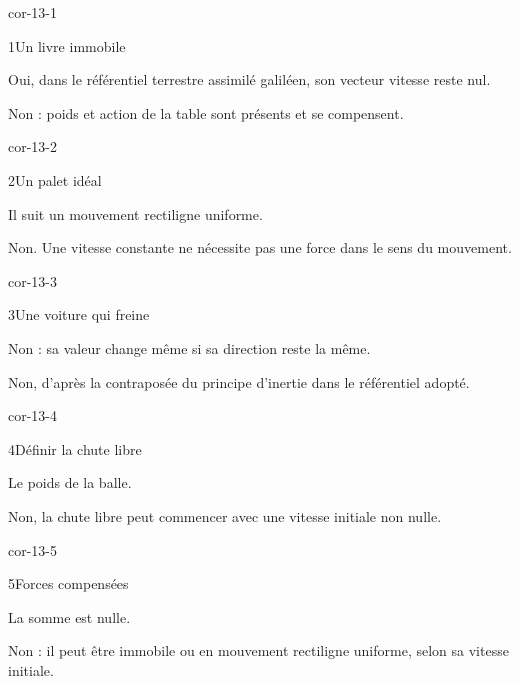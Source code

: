 \clearpage{}
\corrigesSouples
\begin{blocLivre}{cor-13-1}\begin{corrige}{1}{Un livre immobile}
\begin{questions}
\item Oui, dans le référentiel terrestre assimilé galiléen, son vecteur vitesse reste nul.
\item Non : poids et action de la table sont présents et se compensent.
\end{questions}
\end{corrige}\end{blocLivre}
\begin{blocLivre}{cor-13-2}\begin{corrige}{2}{Un palet idéal}
\begin{questions}
\item Il suit un mouvement rectiligne uniforme.
\item Non. Une vitesse constante ne nécessite pas une force dans le sens du mouvement.
\end{questions}
\end{corrige}\end{blocLivre}
\begin{blocLivre}{cor-13-3}\begin{corrige}{3}{Une voiture qui freine}
\begin{questions}
\item Non : sa valeur change même si sa direction reste la même.
\item Non, d’après la contraposée du principe d’inertie dans le référentiel adopté.
\end{questions}
\end{corrige}\end{blocLivre}
\begin{blocLivre}{cor-13-4}\begin{corrige}{4}{Définir la chute libre}
\begin{questions}
\item Le poids de la balle.
\item Non, la chute libre peut commencer avec une vitesse initiale non nulle.
\end{questions}
\end{corrige}\end{blocLivre}
\begin{blocLivre}{cor-13-5}\begin{corrige}{5}{Forces compensées}
\begin{questions}
\item La somme est nulle.
\item Non : il peut être immobile ou en mouvement rectiligne uniforme, selon sa vitesse initiale.
\end{questions}
\end{corrige}\end{blocLivre}
